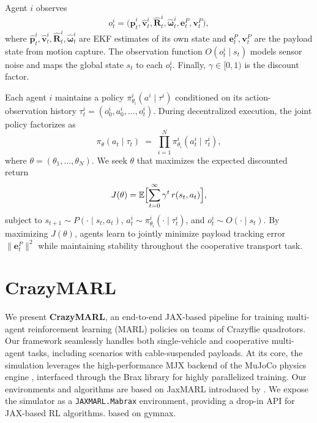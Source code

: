 Agent $i$ observes 
\begin{equation}
o^i_t = \bigl(\hat{\mathbf{p}}^i_t,\hat{\mathbf{v}}^i_t,\hat{\mathbf{R}}^i_t,\hat{\boldsymbol{\omega}}^i_t,\mathbf{e}^P_t,\mathbf{v}^P_t\bigr),
\end{equation}
where $\hat{\mathbf{p}}^i_t,\hat{\mathbf{v}}^i_t,\hat{\mathbf{R}}^i_t,\hat{\boldsymbol{\omega}}^i_t$ are EKF estimates of its own state and $\mathbf{e}^P_t,\mathbf{v}^P_t$ are the payload state from motion capture. The observation function $O(o^i_t \mid s_t)$ models sensor noise and maps the global state $s_t$ to each $o^i_t$. Finally, $\gamma \in [0,1)$ is the discount factor.

Each agent $i$ maintains a policy $\pi^i_{\theta_i}(a^i \mid \tau^i)$ conditioned on its action-observation history $\tau^i_t = (o^i_0,a^i_0,\dots,o^i_t)$. During decentralized execution, the joint policy factorizes as
\begin{equation}
\pi_\theta(a_t \mid \tau_t) \;=\; \prod_{i=1}^N \pi^i_{\theta_i}(a^i_t \mid \tau^i_t),
\end{equation}
where $\theta=(\theta_1,\dots,\theta_N)$. We seek $\theta$ that maximizes the expected discounted return
\begin{equation}
J(\theta) = \mathbb{E}\Bigl[\sum_{t=0}^\infty \gamma^t\,r(s_t,a_t)\Bigr],
\end{equation}
subject to $s_{t+1}\sim P(\cdot\mid s_t,a_t)$, $a^i_t\sim \pi^i_{\theta_i}(\cdot\mid \tau^i_t)$, and $o^i_t\sim O(\cdot\mid s_t)$. By maximizing $J(\theta)$, agents learn to jointly minimize payload tracking error $\|\mathbf{e}^P_t\|^2$ while maintaining stability throughout the cooperative transport task.
\section{CrazyMARL}
We present \textbf{CrazyMARL}, an end-to-end JAX-based pipeline for training multi-agent reinforcement learning (MARL) policies on teams of Crazyflie quadrotors. Our framework seamlessly handles both single-vehicle and cooperative multi-agent tasks, including scenarios with cable-suspended payloads. At its core, the simulation leverages the high-performance MJX backend of the MuJoCo physics engine \cite{todorov_mujoco_2012}, interfaced through the Brax library for highly parallelized training. Our environments and algorithms are based on JaxMARL introduced by \autocite{flair2023jaxmarl}. We expose the simulator as a \texttt{JAXMARL.Mabrax} environment, providing a drop-in API for JAX-based RL algorithms.
\autocite{gymnax2022github} based on gymnax.
